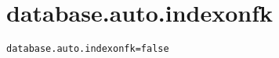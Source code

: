 \section{database.auto.indexonfk}
\label{configuration:DatabaseAutoIndexonfk}
\ClearAPI
\TODO
{}
\begin{lstlisting}[style=Props,caption={Usage example for \textit{database.auto.indexonfk}}]
database.auto.indexonfk=false
\end{lstlisting}